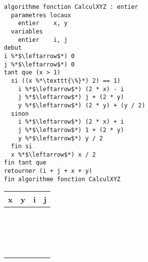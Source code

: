 \documentclass[11pt,a4paper]{article}
\begin{document}
\begin{table}[h!]
  \centering
  \begin{minipage}{0.59\textwidth}
    \centering
\begin{lstlisting}[style=algorithmique]
algorithme fonction CalculXYZ : entier
  parametres locaux
    entier    x, y
  variables
    entier    i, j
debut
i %*$\leftarrow$*) 0
j %*$\leftarrow$*) 0
tant que (x > 1)
  si ((x %*\texttt{\%}*) 2) == 1)
    i %*$\leftarrow$*) (2 * x) - i
    j %*$\leftarrow$*) j + (2 * y)
    y %*$\leftarrow$*) (2 * y) + (y / 2)
  sinon
    i %*$\leftarrow$*) (2 * x) + i
    j %*$\leftarrow$*) 1 + (2 * y)
    y %*$\leftarrow$*) y / 2
  fin si
  x %*$\leftarrow$*) x / 2
fin tant que
retourner (i + j + x + y)
fin algorithme fonction CalculXYZ \end{lstlisting}
  \end{minipage}
  \hfillx
  \begin{minipage}{0.4\textwidth}
    \centering
    \begin{tabular}{| C{1cm} | C{1cm} | C{1cm} | C{1cm} |}
        \hline
          x  &  y  &  i  &  j    \\
        \hline
             &     &     &       \\
             &     &     &       \\
             &     &     &       \\
        \hline
             &     &     &       \\
             &     &     &       \\
             &     &     &       \\
        \hline
             &     &     &       \\
             &     &     &       \\
             &     &     &       \\
        \hline
             &     &     &       \\
             &     &     &       \\
             &     &     &       \\
        \hline
             &     &     &       \\
             &     &     &       \\
             &     &     &       \\
        \hline
             &     &     &       \\
             &     &     &       \\

\end{tabular}
\end{minipage}
\end{table}
\end{document}
